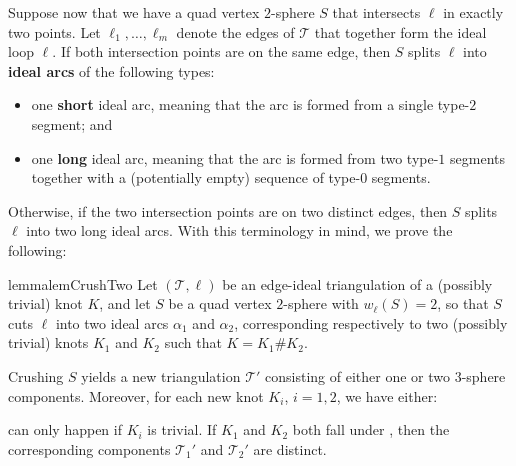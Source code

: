 \documentclass[10pt,a4paper]{amsart}
\newcommand{\tri}{\mathcal{T}}
\begin{document}
Suppose now that we have a quad vertex $2$-sphere $S$ that intersects $\ell$ in exactly two points.
Let $\ell_1, \ldots, \ell_m$ denote the edges of $\tri$ that together form the ideal loop $\ell$.
If both intersection points are on the same edge, then $S$ splits $\ell$ into \textbf{ideal arcs} of the following types:
\begin{itemize}
\item
one \textbf{short} ideal arc, meaning that the arc is formed from a single type-$2$ segment; and
\item
one \textbf{long} ideal arc, meaning that the arc is formed from two type-$1$ segments together with a (potentially empty) sequence of type-$0$ segments.
\end{itemize}
Otherwise, if the two intersection points are on two distinct edges, then $S$ splits $\ell$ into two long ideal arcs.
With this terminology in mind, we prove the following:

\begin{restatable}{lemma}{lemCrushTwo}\label{lem:crushW=2}
Let $(\tri,\ell)$ be an edge-ideal triangulation of a (possibly trivial) knot $K$, and let $S$ be a quad vertex $2$-sphere with $w_\ell(S)=2$,
so that $S$ cuts $\ell$ into two ideal arcs $\alpha_1$ and $\alpha_2$, corresponding respectively to two (possibly trivial) knots $K_1$ and $K_2$ such that $K = K_1 \# K_2$.

Crushing $S$ yields a new triangulation $\tri'$ consisting of either one or two $3$-sphere components.
Moreover, for each new knot $K_i$, $i=1,2$, we have either:
 can only happen if $K_i$ is trivial.
If $K_1$ and $K_2$ both fall under , then the corresponding components $\tri_1'$ and $\tri_2'$ are distinct.
\end{restatable}
\end{document}
